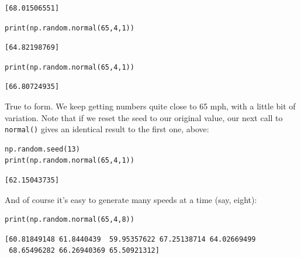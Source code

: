 \begin{Verbatim}[fontsize=\small,samepage=true,frame=leftline,framesep=5mm,framerule=1mm]
[68.01506551]
\end{Verbatim}

\begin{Verbatim}[fontsize=\small,samepage=true,frame=single,framesep=3mm]
print(np.random.normal(65,4,1))
\end{Verbatim}
\vspace{-.2in}

\begin{Verbatim}[fontsize=\small,samepage=true,frame=leftline,framesep=5mm,framerule=1mm]
[64.82198769]
\end{Verbatim}

\begin{Verbatim}[fontsize=\small,samepage=true,frame=single,framesep=3mm]
print(np.random.normal(65,4,1))
\end{Verbatim}
\vspace{-.2in}

\begin{Verbatim}[fontsize=\small,samepage=true,frame=leftline,framesep=5mm,framerule=1mm]
[66.80724935]
\end{Verbatim}

True to form. We keep getting numbers quite close to 65 mph, with a little bit
of variation. Note that if we reset the seed to our original value, our next
call to \texttt{normal()} gives an identical result to the first one, above:

\begin{Verbatim}[fontsize=\small,samepage=true,frame=single,framesep=3mm]
np.random.seed(13)
print(np.random.normal(65,4,1))
\end{Verbatim}
\vspace{-.2in}

\begin{Verbatim}[fontsize=\small,samepage=true,frame=leftline,framesep=5mm,framerule=1mm]
[62.15043735]
\end{Verbatim}

And of course it's easy to generate many speeds at a time (say, eight):

\begin{Verbatim}[fontsize=\small,samepage=true,frame=single,framesep=3mm]
print(np.random.normal(65,4,8))
\end{Verbatim}
\vspace{-.2in}

\begin{Verbatim}[fontsize=\footnotesize,samepage=true,frame=leftline,framesep=5mm,framerule=1mm]
[60.81849148 61.8440439  59.95357622 67.25138714 64.02669499
 68.65496282 66.26940369 65.50921312]
\end{Verbatim}

